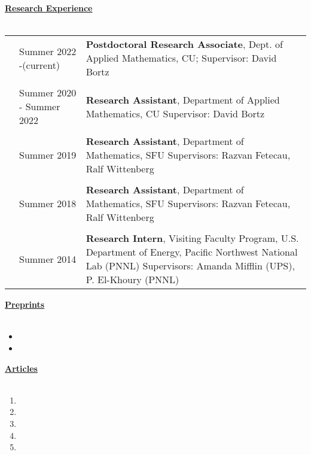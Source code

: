 \documentclass[letterpaper,11pt,oneside]{article}
\newcommand{\headr}[1]{\vspace{10pt}\uline{\Large{\textbf{#1}} \hfill } \\ \vspace{-10pt}\\}
\begin{document}
\headr{Research Experience}

\begin{tabular}{@{} p{0.01cm} p{2.5cm} p{12cm}}
& Summer 2022 -\newline (current)  & 
\textbf{Postdoctoral Research Associate}, Dept. of Applied Mathematics, CU;
Supervisor: David Bortz \\
& & \\
& Summer 2020 - \newline Summer 2022  & 
\textbf{Research Assistant}, Department of Applied Mathematics, CU \newline
Supervisor: David Bortz \\
&     & \\
& Summer 2019  & 
\textbf{Research Assistant}, Department of Mathematics, SFU
\newline Supervisors: Razvan Fetecau, Ralf Wittenberg \\
&     & \\
& Summer 2018  & 
\textbf{Research Assistant}, Department of Mathematics, SFU
\newline Supervisors: Razvan Fetecau, Ralf Wittenberg \\
&     & \\
& Summer 2014  & 
\textbf{Research Intern},  Visiting Faculty Program, U.S. Department of Energy, Pacific Northwest National Lab (PNNL)
\newline Supervisors: Amanda Mifflin (UPS), P. El-Khoury (PNNL) 
\end{tabular}




\headr{Preprints}

\begin{itemize}
\item {}
\item {}
\end{itemize}
\newpage
\headr{Articles}

\begin{enumerate}
\item {}
\item {}
\item {}
\item {}
\item {}
\end{enumerate}
\end{document}
